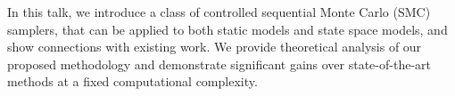 In this talk, we introduce a class of controlled sequential
Monte Carlo (SMC) samplers, that can be applied to both static
models and state space models, and show connections with existing
work. We provide theoretical analysis of our proposed methodology
and demonstrate significant gains over state-of-the-art methods at a
fixed computational complexity.